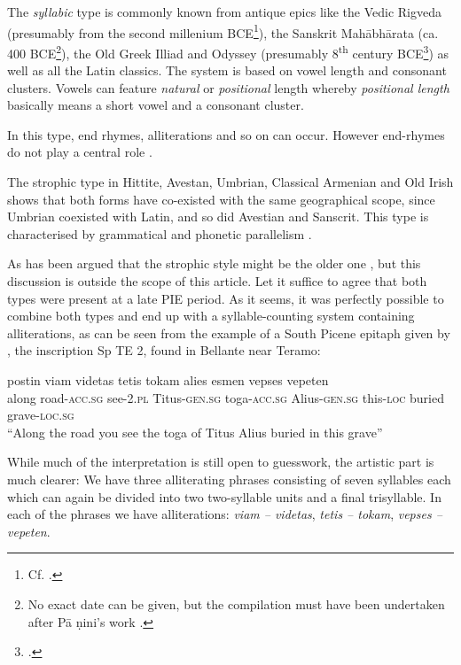 \documentclass[output=paper,hidelinks]{langscibook}
\begin{document}
 
\hspace*{-1.5pt}The \textit{syllabic} type is commonly known from antique epics like the Vedic Rigveda (presumably from the second millenium BCE\footnote{Cf. \citet[208]{Fortson2010}.}), the Sanskrit Mahābhārata (ca. 400 BCE\footnote{No exact date can be given, but the compilation must have been undertaken after Pā
ṇini’s work \citep[208]{Fortson2010}.}), the Old Greek Illiad and Odyssey (presumably 8\textsuperscript{th} century BCE\footnote{\citet[249]{Fortson2010}.}) as well as all the Latin classics. The system is based on vowel length and consonant clusters. Vowels can feature \textit{natural} or \textit{positional} length whereby \textit{positional length} basically means a short vowel and a consonant cluster.
 

 
In this type, end rhymes, alliterations and so on can occur. However end-rhymes do not play a central role \citep[17f, 211f]{Coulson2017}.
 

 
The strophic type in Hittite, Avestan, Umbrian, Classical Armenian and Old Irish shows that both forms have co-existed with the same geographical scope, since Umbrian coexisted with Latin, and so did Avestian and Sanscrit. This type is characterised by grammatical and phonetic parallelism \citep[35]{Fortson2010}.
 

 
As has been argued that the strophic style might be the older one \citep[35]{Fortson2010}, but this discussion is outside the scope of this article. Let it suffice to agree that both types were present at a late PIE period. As it seems, it was perfectly possible to combine both types and end up with a syllable-counting system containing alliterations, as can be seen from the example of a South Picene epitaph given by \citet[301]{Fortson2010}, the inscription Sp TE 2, found in Bellante near Teramo:
 
\ea\gll postin viam videtas tetis tokam alies esmen vepses vepeten\\
     along road-\textsc{acc.sg} see-\textsc{2.pl} Titus-\textsc{gen.sg} toga-\textsc{acc.sg} Alius-\textsc{gen.sg} this-\textsc{loc} buried grave-\textsc{loc.sg}\\
\glt “Along the road you see the toga of Titus Alius buried in this grave”\z

While much of the interpretation is still open to guesswork, the artistic part is much clearer: We have three alliterating phrases consisting of seven syllables each which can again be divided into two two-syllable units and a final trisyllable. In each of the phrases we have alliterations: \textit{viam – videtas}, \textit{tetis – tokam}, \textit{vepses – vepeten}.
 
\end{document}
